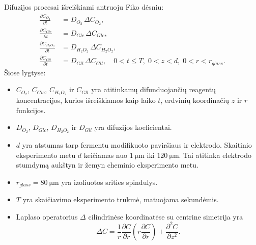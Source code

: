 Difuzijos procesai išreiškiami antruoju Fiko dėsniu:
\begin{equation}
  \begin{aligned}\label{eq:santr_eq1}
  \frac{\partial C_{O_2}}{\partial t} &= D_{O_2}\,\Delta C_{O_2},\\
  \frac{\partial C_{Glc}}{\partial t} &= D_{Glc}\,\Delta C_{Glc},\\
  \frac{\partial C_{H_2 O_2}}{\partial t} &= D_{H_2 O_2} \,\Delta C_{H_2 O_2},\\
  \frac{\partial C_{Gll}}{\partial t} &= D_{Gll}\,\Delta C_{Gll},  \quad 0<t\leq T,\; 0<z<d,\; 0<r<r_{glass}.
  \end{aligned}
\end{equation}
Šiose lygtyse:
\begin{itemize}
  \item[] $C_{O_2}$, $C_{Glc}$, $C_{H_2 O_2}$ ir $C_{Gll}$ yra atitinkamų difunduojančių re\-a\-gen\-tų koncentracijos, kurios išreiškiamos kaip laiko $t$, er\-dvi\-nių ko\-or\-di\-na\-čių $z$ ir $r$ funkcijos. 
  \item[] $D_{O_2}$, $D_{Glc}$, $D_{H_2 O_2}$ ir $D_{Gll}$ yra difuzijos koeficientai.
  \item[] $d$ yra atstumas tarp fermentu modifikuoto paviršiaus ir elektrodo. Skaitinio eksperimento metu $d$ keičiamas nuo $\SI{1}{\um}$ iki $\SI{120}{\um}$. Tai atitinka elektrodo stumdymą aukštyn ir žemyn cheminio eksperimento metu.
  \item[] $r_{glass} = \SI{80}{\um}$ yra izoliuotos srities spindulys.
  \item[] $T$ yra skaičiavimo eksperimento trukmė, matuojama sekundėmis.
  \item[] Laplaso operatorius $\Delta$ cilindrinėse koordinatėse su centrine simetrija yra
  \begin{equation*}
  \Delta C = \frac{1}{r}\frac{\partial C }{\partial r} \left( r\frac{\partial C }{\partial r} \right) + \frac{\partial^{2} C}{\partial z^{2}}.
  \end{equation*}
\end{itemize}


